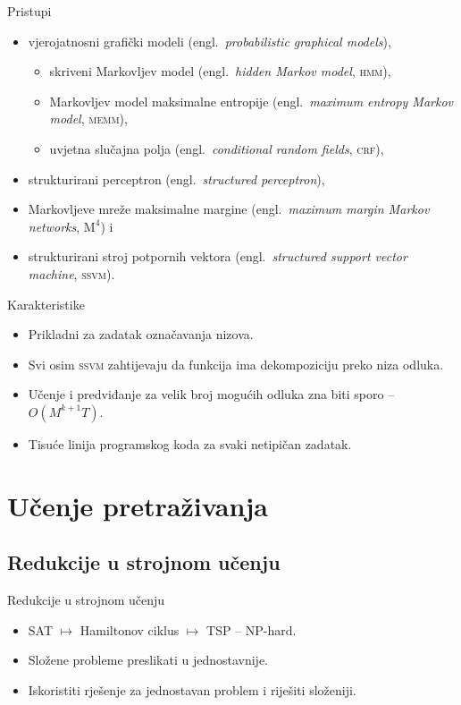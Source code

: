 \documentclass{beamer}
\newcommand{\engla}[2]{(engl.~\emph{#1}, \textsc{#2})}
\newcommand{\engl}[1]{(engl.~\emph{#1})}
\newcommand*{\mmmm}[0]{$\text{M}^4$}
\begin{document}
\begin{frame}{Pristupi}
  \begin{itemize}
    \item vjerojatnosni grafički modeli \engl{probabilistic graphical models},
    \begin{itemize}
      \item skriveni Markovljev model \engla{hidden Markov model}{hmm},
      \item Markovljev model maksimalne entropije \engla{maximum entropy Markov
      model}{memm},
      \item uvjetna slučajna polja \engla{conditional random fields}{crf},
    \end{itemize}
    \item strukturirani perceptron \engl{structured perceptron},
    \item Markovljeve mreže maksimalne margine \engla{maximum margin Markov
    networks}{\mmmm{}} i
    \item strukturirani stroj potpornih vektora \engla{structured support vector machine}{ssvm}.
  \end{itemize}
\end{frame}

\begin{frame}{Karakteristike}
  \begin{itemize}
    \item Prikladni za zadatak označavanja nizova.
    \item Svi osim \textsc{ssvm} zahtijevaju da funkcija ima dekompoziciju preko niza odluka.
    \item Učenje i predviđanje za velik broj mogućih odluka zna biti sporo --
    $O(M^{k+1} T)$.
    \item Tisuće linija programskog koda za svaki netipičan zadatak.
  \end{itemize}
\end{frame}

\section{Učenje pretraživanja}

\subsection{Redukcije u strojnom učenju}
\begin{frame}{Redukcije u strojnom učenju}
  \begin{itemize}
  \item SAT $\mapsto$ Hamiltonov ciklus $\mapsto$ TSP -- NP-hard.
  \item Složene probleme preslikati u jednostavnije.
  \item Iskoristiti rješenje za jednostavan problem i riješiti složeniji.
  \end{itemize}
\end{frame}
\end{document}
